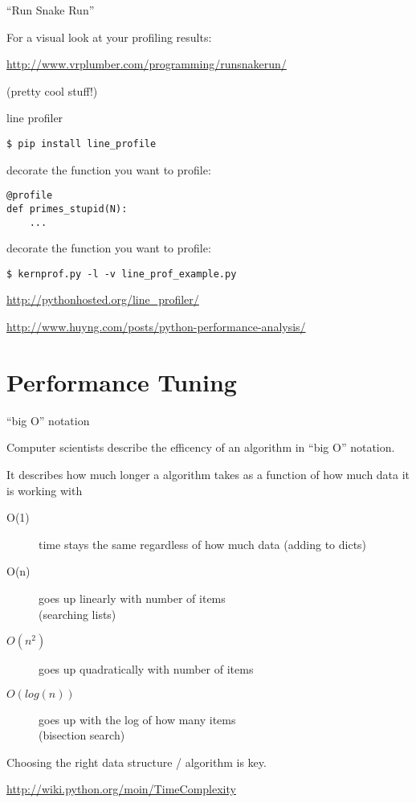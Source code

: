 \documentclass{beamer}
\begin{document}
\begin{frame}[fragile]{``Run Snake Run''}

\vfill
{\Large For a visual look at your profiling results:}

\vfill
\url{http://www.vrplumber.com/programming/runsnakerun/}

\vfill
(pretty cool stuff!)

\end{frame} 

\begin{frame}[fragile]{line profiler}

\vfill
{\large \verb|$ pip install line_profile|}

\vfill
{\large decorate the function you want to profile:}

\begin{verbatim}
@profile
def primes_stupid(N):
    ...
\end{verbatim}

\vfill
{\large decorate the function you want to profile:}

{\large \verb|$ kernprof.py -l -v line_prof_example.py|}


\vfill
\url{http://pythonhosted.org/line_profiler/}

\vfill
\url{http://www.huyng.com/posts/python-performance-analysis/}

\end{frame}


\section{Performance Tuning}


\begin{frame}[fragile]{``big O'' notation}

\vfill
{\Large Computer scientists describe the efficency of an algorithm in ``big O'' notation.}

\vfill
{\Large It describes how much longer a algorithm takes as a function of how much data it is working with}

\vfill
\begin{description}
  \item[O(1)] time stays the same regardless of how much data (adding to dicts)
  \item[O(n)] goes up linearly with number of items\\
              (searching lists)
  \item[$O(n^2)$] goes up quadratically with number of items\\
  \item[$O(log(n))$] goes up with the log of how many items\\
                     (bisection search)
\end{description}

Choosing the right data structure / algorithm is key.

\url{http://wiki.python.org/moin/TimeComplexity}

\end{frame} 
\end{document}
